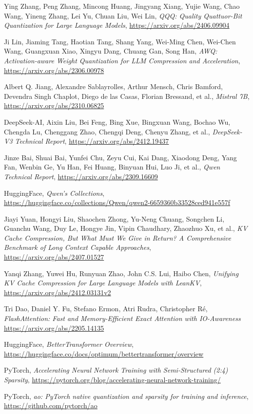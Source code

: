 \begin{thebibliography}{9}
	Ying Zhang, Peng Zhang, Mincong Huang, Jingyang Xiang, Yujie Wang, Chao Wang, Yineng Zhang, Lei Yu, Chuan Liu, Wei Lin,
	\textit{QQQ: Quality Quattuor-Bit Quantization for Large Language Models},
	\url{https://arxiv.org/abs/2406.09904}

	Ji Lin, Jiaming Tang, Haotian Tang, Shang Yang, Wei-Ming Chen, Wei-Chen Wang, Guangxuan Xiao, Xingyu Dang, Chuang Gan, Song Han,
	\textit{AWQ: Activation-aware Weight Quantization for LLM Compression and Acceleration},
	\url{https://arxiv.org/abs/2306.00978}

	Albert Q. Jiang, Alexandre Sablayrolles, Arthur Mensch, Chris Bamford, Devendra Singh Chaplot, Diego de las Casas, Florian Bressand, et al.,
	\textit{Mistral 7B},
	\url{https://arxiv.org/abs/2310.06825}

	DeepSeek-AI, Aixin Liu, Bei Feng, Bing Xue, Bingxuan Wang, Bochao Wu, Chengda Lu, Chenggang Zhao, Chengqi Deng, Chenyu Zhang, et al.,
	\textit{DeepSeek-V3 Technical Report},
	\url{https://arxiv.org/abs/2412.19437}

	Jinze Bai, Shuai Bai, Yunfei Chu, Zeyu Cui, Kai Dang, Xiaodong Deng, Yang Fan, Wenbin Ge, Yu Han, Fei Huang, Binyuan Hui, Luo Ji, et al.,
	\textit{Qwen Technical Report},
	\url{https://arxiv.org/abs/2309.16609}

	HuggingFace,
	\textit{Qwen's Collections},
	\url{https://huggingface.co/collections/Qwen/qwen2-6659360b33528ced941e557f}

	Jiayi Yuan, Hongyi Liu, Shaochen Zhong, Yu-Neng Chuang, Songchen Li, Guanchu Wang, Duy Le, Hongye Jin, Vipin Chaudhary, Zhaozhuo Xu, et al.,
	\textit{KV Cache Compression, But What Must We Give in Return? A Comprehensive Benchmark of Long Context Capable Approaches},
	\url{https://arxiv.org/abs/2407.01527}

	Yanqi Zhang, Yuwei Hu, Runyuan Zhao, John C.S. Lui, Haibo Chen,
	\textit{Unifying KV Cache Compression for Large Language Models with LeanKV},
	\url{https://arxiv.org/abs/2412.03131v2}

	Tri Dao, Daniel Y. Fu, Stefano Ermon, Atri Rudra, Christopher Ré,
	\textit{FlashAttention: Fast and Memory-Efficient Exact Attention with IO-Awareness}
	\url{https://arxiv.org/abs/2205.14135}

	HuggingFace,
	\textit{BetterTransformer Overview},
	\url{https://huggingface.co/docs/optimum/bettertransformer/overview}

	PyTorch,
	\textit{Accelerating Neural Network Training with Semi-Structured (2:4) Sparsity},
	\url{https://pytorch.org/blog/accelerating-neural-network-training/}

	PyTorch,
	\textit{ao: PyTorch native quantization and sparsity for training and inference},
	\url{https://github.com/pytorch/ao}


\end{thebibliography}